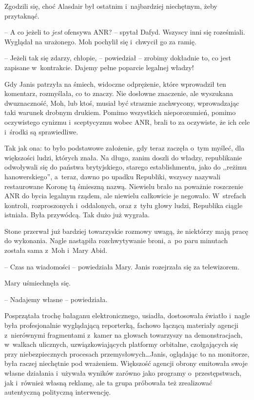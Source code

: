 \documentclass[oneside,polish,11pt,sfheadings]{mwbk}
\begin{document}
Zgodzili się, choć Alasdair był ostatnim i~najbardziej niechętnym, żeby
przytaknąć.

-- A co jeżeli to \emph{jest} ofensywa ANR? -- spytał Dafyd. Wszyscy inni
się roześmiali. Wyglądał na urażonego. Moh pochylił się i~chwycił go za
ramię.

-- Jeżeli tak się zdarzy, chłopie, -- powiedział -- zrobimy dokładnie to,
co jest zapisane w~kontrakcie. Dajemy pełne poparcie legalnej władzy!

Gdy Janis patrzyła na śmiech, widoczne odprężenie, które wprowadził ten
komentarz, rozmyślała, co to znaczy. Nie dosłowne znaczenie, ale
wyszukana dwuznaczność, Moh, lub ktoś, musiał być strasznie zachwycony,
wprowadzając taki warunek drobnym drukiem. Pomimo wszystkich
nieporozumień, pomimo oczywistego cynizmu i~sceptycyzmu wobec ANR, brali
to za oczywiste, że ich cele i~środki są sprawiedliwe.

Tak jak ona: to było podstawowe założenie, gdy teraz zaczęła o~tym
myśleć, dla większości ludzi, których znała. Na długo, zanim doszli do
władzy, republikanie odwoływali się do państwa brytyjskiego, starego
establishmentu, jako do ,,reżimu hanowerskiego'', a~teraz, dawno po upadku
Republiki, wszyscy nazywali restaurowane Koronę tą śmieszną nazwą.
Niewielu brało na poważnie roszczenie ANR do bycia legalnym rządem, ale
niewielu całkowicie je negowało. W~strefach kontroli, rozproszonych i~oddalonych, oraz z~tyłu głowy ludzi, Republika ciągle istniała. Była
przywódcą. Tak dużo już wygrała.

Stone przerwał już bardziej towarzyskie rozmowy uwagą, że niektórzy mają
pracę do wykonania. Nagle nastąpiła rozchwytywanie broni, a~po paru
minutach została sama z~Moh i~Mary Abid.

-- Czas na wiadomości -- powiedziała Mary. Janis rozejrzała się za
telewizorem.

Mary uśmiechnęła się. 

-- Nadajemy własne -- powiedziała.

Posprzątała trochę bałaganu elektronicznego, usiadła, dostosowała
światło i~nagle była profesjonalnie wyglądającą reporterką, fachowo
łączącą materiały agencji z~nierównymi fragmentami z~kamer na głowach
towarzyszy na demonstracjach, w~walkach ulicznych, uzwiązkowiających
platformy orbitalne, czołgających się przy niebezpiecznych procesach
przemysłowych\ldots Janis, oglądając to na monitorze, była raczej
niechętnie pod wrażeniem. Większość agencji obrony emitowała swoje
własne działania i~używała wyników zarówno jako programy o~przestępstwach, jak i~również własną reklamę, ale ta grupa próbowała też
zrealizować autentyczną polityczną interwencję.
\end{document}
